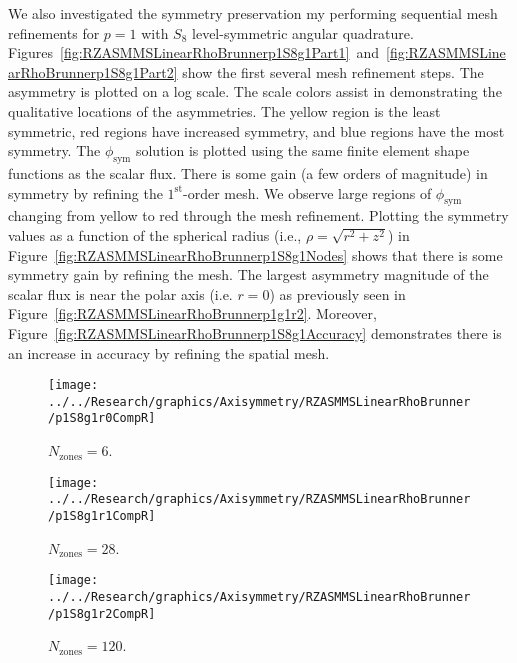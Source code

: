 \documentclass[12pt]{article}
\begin{document}
\FloatBarrier

We also investigated the symmetry preservation my performing sequential mesh refinements for $p=1$ with $S_8$ level-symmetric angular quadrature. Figures~\ref{fig:RZASMMSLinearRhoBrunnerp1S8g1Part1}~and~\ref{fig:RZASMMSLinearRhoBrunnerp1S8g1Part2} show the first several mesh refinement steps. The asymmetry is plotted on a log scale. The scale colors assist in demonstrating the qualitative locations of the asymmetries. The yellow region is the least symmetric, red regions have increased symmetry, and blue regions have the most symmetry. The $\phi_\text{sym}$ solution is plotted using the same finite element shape functions as the scalar flux. There is some gain (a few orders of magnitude) in symmetry by refining the $1^\text{st}$-order mesh. We observe large regions of $\phi_\text{sym}$ changing from yellow to red through the mesh refinement. Plotting the symmetry values as a function of the spherical radius (i.e., $\rho=\sqrt{r^2+z^2}$) in Figure~\ref{fig:RZASMMSLinearRhoBrunnerp1S8g1Nodes} shows that there is some symmetry gain by refining the mesh. The largest asymmetry magnitude of the scalar flux is near the polar axis (i.e. $r=0$) as previously seen in Figure~\ref{fig:RZASMMSLinearRhoBrunnerp1g1r2}. Moreover, Figure~\ref{fig:RZASMMSLinearRhoBrunnerp1S8g1Accuracy} demonstrates there is an increase in accuracy by refining the spatial mesh.

\begin{sidewaysfigure}[!htb]
\centering
\begin{subfigure}{0.33\textwidth}
\texttt{[image: ../../Research/graphics/Axisymmetry/RZASMMSLinearRhoBrunner/p1S8g1r0CompR]}
\caption{$N_\text{zones}=6$.}
\end{subfigure}%
\begin{subfigure}{0.33\textwidth}
\texttt{[image: ../../Research/graphics/Axisymmetry/RZASMMSLinearRhoBrunner/p1S8g1r1CompR]}
\caption{$N_\text{zones}=28$.}
\end{subfigure}%
\begin{subfigure}{0.33\textwidth}
\texttt{[image: ../../Research/graphics/Axisymmetry/RZASMMSLinearRhoBrunner/p1S8g1r2CompR]}
\caption{$N_\text{zones}=120$.}
\end{subfigure}
\caption{Relative asymmetry for $p=1$ finite elements on a $1^\text{st}$-order mesh for $S_8$ level-symmetric angular quadrature for $N_\text{zones}=\{6,28,120\}$.}
\label{fig:RZASMMSLinearRhoBrunnerp1S8g1Part1}
\end{sidewaysfigure}
\end{document}
